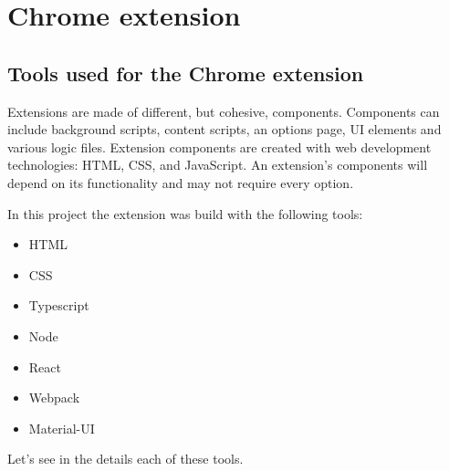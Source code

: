 
\section{Chrome extension}
\subsection{Tools used for the Chrome extension}

Extensions are made of different, but cohesive, components. Components can include background scripts, content scripts, an options page, UI elements and various logic files. Extension components are created with web development technologies: HTML, CSS, and JavaScript. An extension's components will depend on its functionality and may not require every option.

In this project the extension was build with the following tools:

\begin{itemize}
    \item HTML \cite{html}
    \item CSS \cite{css}
    \item Typescript \cite{ts}
    \item Node \cite{node}
    \item React \cite{react}
    \item Webpack \cite{webpack}
    \item Material-UI \cite{mui}
\end{itemize}

Let's see in the details each of these tools.

